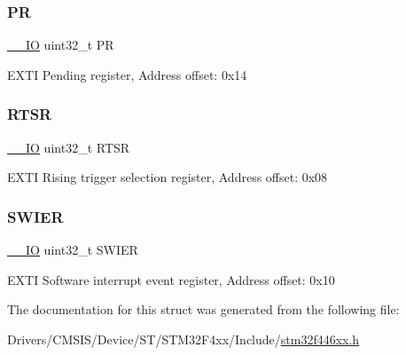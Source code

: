 \subsubsection{\texorpdfstring{PR}{PR}}
{\footnotesize\ttfamily \mbox{\hyperlink{core__sc300_8h_aec43007d9998a0a0e01faede4133d6be}{\+\_\+\+\_\+\+IO}} uint32\+\_\+t PR}

E\+X\+TI Pending register, Address offset\+: 0x14 \mbox{\label{struct_e_x_t_i___type_def_a0d952a17455687d6e9053730d028fa1d}} 
\subsubsection{\texorpdfstring{R\+T\+SR}{RTSR}}
{\footnotesize\ttfamily \mbox{\hyperlink{core__sc300_8h_aec43007d9998a0a0e01faede4133d6be}{\+\_\+\+\_\+\+IO}} uint32\+\_\+t R\+T\+SR}

E\+X\+TI Rising trigger selection register, Address offset\+: 0x08 \mbox{\label{struct_e_x_t_i___type_def_a9eae93b6cc13d4d25e12f2224e2369c9}} 
\subsubsection{\texorpdfstring{S\+W\+I\+ER}{SWIER}}
{\footnotesize\ttfamily \mbox{\hyperlink{core__sc300_8h_aec43007d9998a0a0e01faede4133d6be}{\+\_\+\+\_\+\+IO}} uint32\+\_\+t S\+W\+I\+ER}

E\+X\+TI Software interrupt event register, Address offset\+: 0x10 

The documentation for this struct was generated from the following file\+:\begin{DoxyCompactItemize}
\item 
Drivers/\+C\+M\+S\+I\+S/\+Device/\+S\+T/\+S\+T\+M32\+F4xx/\+Include/\mbox{\hyperlink{stm32f446xx_8h}{stm32f446xx.\+h}}\end{DoxyCompactItemize}

